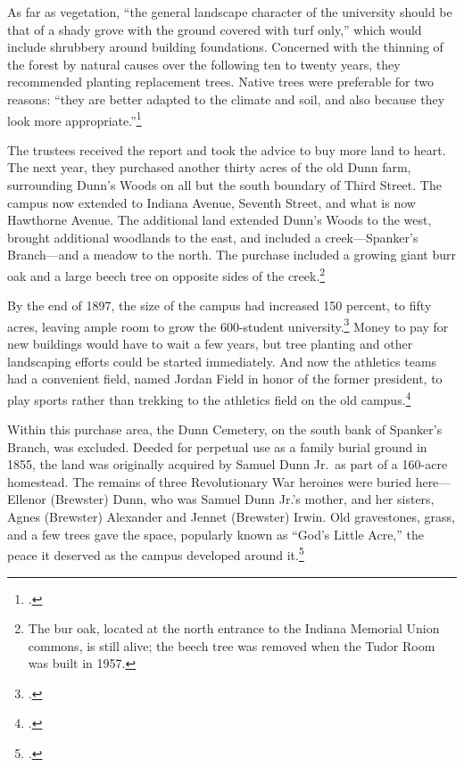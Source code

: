 \documentclass[
  american,
  letterpaper,
]{scrreprt}
\begin{document}
As far as vegetation, ``the general landscape character of the
university should be that of a shady grove with the ground covered with
turf only,'' which would include shrubbery around building foundations.
Concerned with the thinning of the forest by natural causes over the
following ten to twenty years, they recommended planting replacement
trees. Native trees were preferable for two reasons: ``they are better
adapted to the climate and soil, and also because they look more
appropriate.''\footnote{.}

The trustees received the report and took the advice to buy more land to
heart. The next year, they purchased another thirty acres of the old
Dunn farm, surrounding Dunn's Woods on all but the south boundary of
Third Street. The campus now extended to Indiana Avenue, Seventh Street,
and what is now Hawthorne Avenue. The additional land extended Dunn's
Woods to the west, brought additional woodlands to the east, and
included a creek---Spanker's Branch---and a meadow to the north. The
purchase included a growing giant burr oak and a large beech tree on
opposite sides of the creek.\footnote{The bur oak, located at the north
  entrance to the Indiana Memorial Union commons, is still alive; the
  beech tree was removed when the Tudor Room was built in 1957.}

By the end of 1897, the size of the campus had increased 150 percent, to
fifty acres, leaving ample room to grow the 600-student
university.\footnote{.} Money to pay for new buildings would
have to wait a few years, but tree planting and other landscaping
efforts could be started immediately. And now the athletics teams had a
convenient field, named Jordan Field in honor of the former president,
to play sports rather than trekking to the athletics field on the old
campus.\footnote{.}

Within this purchase area, the Dunn Cemetery, on the south bank of
Spanker's Branch, was excluded. Deeded for perpetual use as a family
burial ground in 1855, the land was originally acquired by Samuel Dunn
Jr.~as part of a 160-acre homestead. The remains of three Revolutionary
War heroines were buried here---Ellenor (Brewster) Dunn, who was Samuel
Dunn Jr.'s mother, and her sisters, Agnes (Brewster) Alexander and
Jennet (Brewster) Irwin. Old gravestones, grass, and a few trees gave
the space, popularly known as ``God's Little Acre,'' the peace it
deserved as the campus developed around it.\footnote{.}
\end{document}
